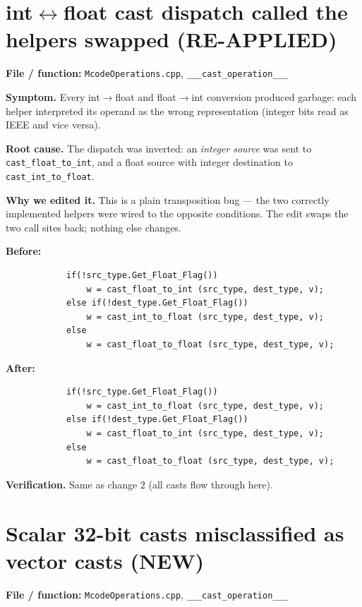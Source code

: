\documentclass[11pt,a4paper]{report}
\begin{document}
\section{int$\leftrightarrow$float cast dispatch called the helpers swapped (RE-APPLIED)}

\textbf{File / function:} \texttt{McodeOperations.cpp},
\texttt{\_\_\_cast\_operation\_\_\_}

\textbf{Symptom.} Every int$\to$float and float$\to$int conversion produced
garbage: each helper interpreted its operand as the wrong representation
(integer bits read as IEEE and vice versa).

\textbf{Root cause.} The dispatch was inverted: an \emph{integer source} was
sent to \texttt{cast\_float\_to\_int}, and a float source with integer
destination to \texttt{cast\_int\_to\_float}.

\textbf{Why we edited it.} This is a plain transposition bug --- the two
correctly implemented helpers were wired to the opposite conditions. The edit
swaps the two call sites back; nothing else changes.

\textbf{Before:}
\begin{lstlisting}
            if(!src_type.Get_Float_Flag())
                w = cast_float_to_int (src_type, dest_type, v);
            else if(!dest_type.Get_Float_Flag())
                w = cast_int_to_float (src_type, dest_type, v);
            else
                w = cast_float_to_float (src_type, dest_type, v);
\end{lstlisting}

\textbf{After:}
\begin{lstlisting}
            if(!src_type.Get_Float_Flag())
                w = cast_int_to_float (src_type, dest_type, v);
            else if(!dest_type.Get_Float_Flag())
                w = cast_float_to_int (src_type, dest_type, v);
            else
                w = cast_float_to_float (src_type, dest_type, v);
\end{lstlisting}

\textbf{Verification.} Same as change 2 (all casts flow through here).

\section{Scalar 32-bit casts misclassified as vector casts (NEW)}

\textbf{File / function:} \texttt{McodeOperations.cpp},
\texttt{\_\_\_cast\_operation\_\_\_}
\end{document}
